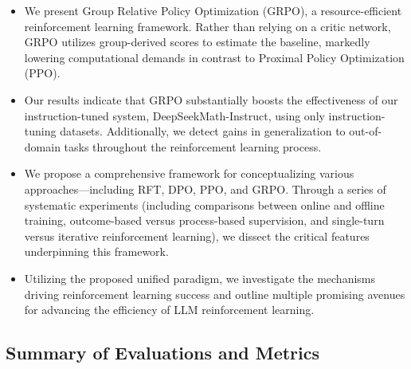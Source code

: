 \begin{itemize}[topsep=0pt]
    \item We present Group Relative Policy Optimization (GRPO), a resource-efficient reinforcement learning framework. Rather than relying on a critic network, GRPO utilizes group-derived scores to estimate the baseline, markedly lowering computational demands in contrast to Proximal Policy Optimization (PPO).
    \item Our results indicate that GRPO substantially boosts the effectiveness of our instruction-tuned system, DeepSeekMath-Instruct, using only instruction-tuning datasets. Additionally, we detect gains in generalization to out-of-domain tasks throughout the reinforcement learning process.
    \item We propose a comprehensive framework for conceptualizing various approaches—including RFT, DPO, PPO, and GRPO. Through a series of systematic experiments (including comparisons between online and offline training, outcome-based versus process-based supervision, and single-turn versus iterative reinforcement learning), we dissect the critical features underpinning this framework.
    \item Utilizing the proposed unified paradigm, we investigate the mechanisms driving reinforcement learning success and outline multiple promising avenues for advancing the efficiency of LLM reinforcement learning.
\end{itemize}

\subsection{Summary of Evaluations and Metrics}

